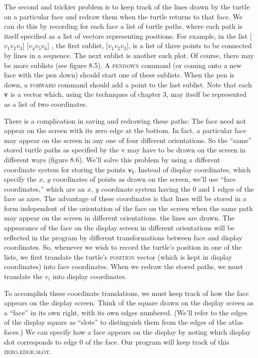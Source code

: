 \documentclass{book}
\begin{document}
The second and trickier problem is to keep track of the lines drawn by
the turtle on a particular face and redraw them when the turtle returns
to that face. We can do this by recording for each face a list of turtle
paths, where each path is itself specified as a list of vectors representing
positions. For example, in the list [$v_1 v_2 v_3$] [$v_4 v_5 v_6$] , the first
sublist, [$v_1 v_2 v_3$], is a list of three points to be connected by lines
in a sequence. The next sublist is another such plot. Of course, there
may be more sublists (see figure 8.5). A \textsc{pendown} command (or coming
onto a new face with the pen down) should start one of these sublists.
When the pen is down, a \textsc{forward} command should add a point to the
last sublist. Note that each \textbf{v} is a vector which, using the techniques of
chapter 3, may itself be represented as a list of two coordinates.

   There is a complication in saving and redrawing these paths: The face
need not appear on the screen with its zero edge at the bottom. In fact,
a particular face may appear on the screen in any one of four different
orientations. So the ``same'' stored turtle paths as specified by the v may
have to be drawn on the screen in different ways (figure 8.6). We'll solve
this problem by using a different coordinate system for storing the points
$\mathbf{v_i}$. Instead of display coordinates, which specify the $x$, $y$ coordinates
of points as drawn on the screen, we'll use ``face coordinates,'' which
are an $x$, $y$ coordinate system having the 0 and 1 edges of the face as
axes. The advantage of these coordinates is that lines will be stored in
a form independent of the orientation of the face on the screen when
the same path may appear on the screen in different orientations.
the lines are drawn. The appearance of the face on the display screen
in different orientations will be reflected in the program by different
transformations between face and display coordinates. So, whenever we
wish to record the turtle's position in one of the lists, we first translate
the turtle's \textsc{position} vector (which is kept in display coordinates) into
face coordinates. When we redraw the stored paths, we must translate
the $v_i$ into display coordinates.

To accomplish these coordinate translations, we must keep track of
how the face appears on the display screen. Think of the square drawn
on the display screen as a ``face'' in its own right, with its own edges
numbered. (We'll refer to the edges of the display square as ``slots'' to
distinguish them from the edges of the atlas faces.) We can specify how
a face appears on the display by noting which display slot corresponds to
edge 0 of the face. Our program will keep track of this \textsc{zero}\textsc{.edge}\textsc{.slot}.
\end{document}
